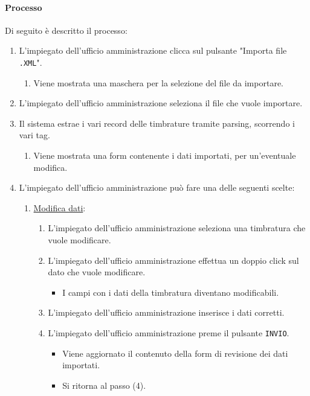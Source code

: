 \paragraph{Processo}
Di seguito è descritto il processo:
\begin{enumerate}
	\item L'impiegato dell'ufficio amministrazione clicca sul pulsante "Importa file \verb|.XML|".
		\begin{enumerate}
			\item Viene mostrata una maschera per la selezione del file da importare.
		\end{enumerate}	
	\item L'impiegato dell'ufficio amministrazione seleziona il file che vuole importare. 
	\item Il sistema estrae i vari record delle timbrature tramite parsing, scorrendo i vari tag.
		\begin{enumerate}
			\item Viene mostrata una form contenente i dati importati, per un'eventuale modifica.
		\end{enumerate}		
	\item L'impiegato dell'ufficio amministrazione può fare una delle seguenti scelte:
		\begin{enumerate}
			\item \underline{Modifica dati}:
				\begin{enumerate}
						\item L'impiegato dell'ufficio amministrazione seleziona una timbratura che vuole modificare.
						\item L'impiegato dell'ufficio amministrazione effettua un doppio click sul dato che vuole modificare.
							\begin{itemize}
								\item I campi con i dati della timbratura diventano modificabili.
							\end{itemize}
						\item L'impiegato dell'ufficio amministrazione inserisce i dati corretti.
						\item L'impiegato dell'ufficio amministrazione preme il pulsante \verb|INVIO|.
							\begin{itemize}
								\item Viene aggiornato il contenuto della form di revisione dei dati importati.
								\item Si ritorna al passo (4).
							\end{itemize}

\end{enumerate}
\end{enumerate}
\end{enumerate}
